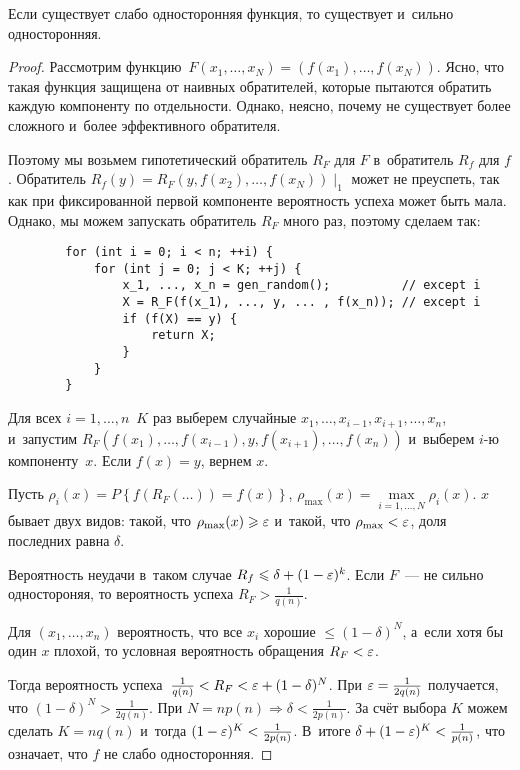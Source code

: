 \documentclass{article}
\begin{document}
\begin{theorem}
	Если существует слабо односторонняя функция, то существует и~сильно
	односторонняя.
\end{theorem}
\begin{proof}
	Рассмотрим функцию~$F(x_1, \ldots, x_N) = (f(x_1), \ldots, f(x_N))$. Ясно, что
	такая функция защищена от наивных обратителей, которые пытаются обратить
	каждую компоненту по отдельности. Однако, неясно, почему не существует более
	сложного и~более эффективного обратителя.

	Поэтому мы возьмем гипотетический обратитель $R_F$ для $F$ в~обратитель $R_f$
	для $f$. Обратитель $R_f(y) = R_F(y, f(x_2), \ldots, f(x_N))\mid_1$ может не
	преуспеть, так как при фиксированной первой компоненте вероятность успеха
	может быть мала. Однако, мы можем запускать обратитель $R_F$ много раз,
	поэтому сделаем так:

	\begin{verbatim}
		for (int i = 0; i < n; ++i) {
			for (int j = 0; j < K; ++j) {
				x_1, ..., x_n = gen_random();          // except i
				X = R_F(f(x_1), ..., y, ... , f(x_n)); // except i
				if (f(X) == y) {
					return X;
				}
			}
		}
	\end{verbatim}

	Для всех $i = 1, \ldots, n$~$K$ раз выберем случайные $x_1, \ldots, x_{i-1},
	x_{i+1}, \ldots, x_n$, и~запустим $R_F(f(x_1), \ldots, f(x_{i-1}), y,
	f(x_{i+1}), \ldots, f(x_n))$ и~выберем $i$-ю компоненту~$x$. Если $f(x) = y$,
	вернем $x$.

	Пусть $\rho_i(x) = P \left\{ f(R_F(\ldots)) = f(x) \right\}$, $\rho_{\max}(x) =
	\underset{i=1,\ldots,N}{\max} \rho_i(x)$. $x$ бывает двух видов: такой, что
	$\rho_{\max}(x) \geqslant \varepsilon$ и~такой, что $\rho_{\max} < \varepsilon$, доля последних
	равна $\delta$.

	Вероятность неудачи в~таком случае $R_f \leqslant \delta + (1 -
	\varepsilon)^k$. Если $F$~--- не сильно одностороняя, то вероятность успеха $R_F >
	\frac{1}{q(n)}$.

	Для $(x_1, \ldots, x_n)$ вероятность, что все $x_i$ хорошие $\le (1 -
	\delta)^N$, а~если хотя бы один $x$ плохой, то условная вероятность обращения
	$R_F < \varepsilon$.

	Тогда вероятность успеха~$\frac{1}{q(n)} < R_F < \varepsilon + (1 - \delta)^N$. При
	$\varepsilon = \frac{1}{2q(n)}$ получается, что $(1 - \delta)^N > \frac{1}{2q(n)}$.
	При $N = n p(n) \Rightarrow \delta < \frac{1}{2p(n)}$. За счёт выбора $K$
	можем сделать $K = n q(n)$ и~тогда $(1 - \varepsilon)^K < \frac{1}{2p(n)}$. В~итоге
	$\delta + (1 - \varepsilon)^K < \frac{1}{p(n)}$, что означает, что $f$ не слабо
	односторонняя.
\end{proof}
\end{document}
